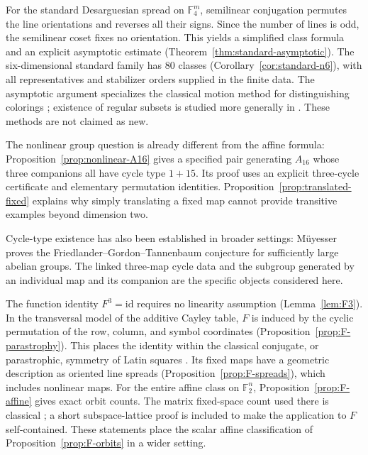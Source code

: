 \documentclass[11pt]{article}
\begin{document}
For the standard Desarguesian spread on $\mathbb F_4^m$, semilinear
conjugation permutes the line orientations and reverses all their signs.
Since the number of lines is odd, the semilinear coset fixes no orientation.
This yields a simplified class formula and an explicit asymptotic estimate
(Theorem~\ref{thm:standard-asymptotic}). The six-dimensional standard family
has $80$ classes (Corollary~\ref{cor:standard-n6}), with all representatives
and stabilizer orders supplied in the finite data.
The asymptotic argument specializes the classical motion method for
distinguishing colorings \cite{RS98}; existence of regular subsets is studied
more generally in \cite{CNS84,Se97}. These methods are not claimed as new.

The nonlinear group question is already different from the affine formula:
Proposition~\ref{prop:nonlinear-A16} gives a specified pair generating $A_{16}$
whose three companions all have cycle type $1+15$. Its proof uses an explicit
three-cycle certificate and elementary permutation identities.
Proposition~\ref{prop:translated-fixed} explains why simply translating a
fixed map cannot provide transitive examples beyond dimension two.

Cycle-type existence has also been established in broader settings: M\"uyesser
\cite{Muy26} proves the Friedlander--Gordon--Tannenbaum conjecture for sufficiently
large abelian groups. The linked three-map cycle data and the subgroup generated
by an individual map and its companion are the specific objects considered here.

The function identity $F^3=\mathrm{id}$ requires no linearity assumption
(Lemma~\ref{lem:F3}). In the transversal model of the additive Cayley table,
$F$ is induced by the cyclic permutation of the row, column, and symbol
coordinates (Proposition~\ref{prop:F-parastrophy}). This places the identity
within the classical conjugate, or parastrophic, symmetry of Latin squares
\cite{MW22}. Its fixed maps have a geometric description as oriented
line spreads (Proposition~\ref{prop:F-spreads}), which includes nonlinear maps.
For the entire affine class on $\mathbb F_2^n$, Proposition~\ref{prop:F-affine}
gives exact orbit counts. The matrix fixed-space count used there is classical
\cite[Theorem~2.1]{FS15}; a short subspace-lattice proof is included to make
the application to $F$ self-contained. These statements place the scalar affine
classification of Proposition~\ref{prop:F-orbits} in a wider setting.
\end{document}
